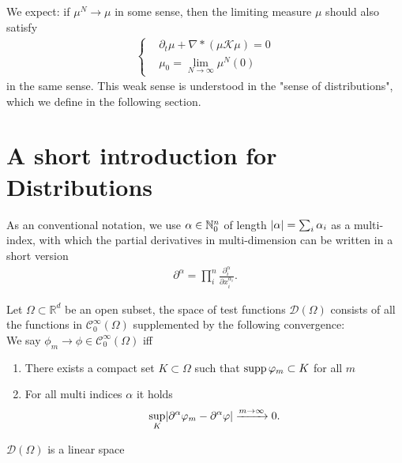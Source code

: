 We expect: if $\mu ^{N} \to \mu  $  in some sense, then the limiting measure $\mu $ should also satisfy 
 \begin{align*}
  \begin{cases}
    &\partial_t \mu  + \nabla * (\mu \mathcal{K} \mu ) = 0 \\
    & \mu_0=\lim_{N\to\infty}\mu^N(0)
  \end{cases}
\end{align*}
in the same sense. This weak sense is understood in the "sense of distributions", which we define in the following section.

\section{A short introduction for Distributions}

As an conventional notation, we use $\alpha \in \mathbb{N}_0^n$ of length $\lvert\alpha \rvert = \sum_{i} \alpha_i$ as a multi-index, with which the partial derivatives in multi-dimension can be written in a short version
	\begin{align*}
	\partial^{\alpha } = \prod^n_i \frac{\partial^\alpha_i}{\partial x_i^{\alpha_i}}
	.\end{align*}

\begin{definition}
 Let $\Omega  \subset  \mathbb{R}^{d} $  be an open subset, the space of test functions $\mathcal{D}(\Omega )$
 consists of all the functions in $\mathcal{C}_0^{\infty}(\Omega ) $ supplemented by the following convergence: \\[1ex]
 We say $\phi_m \to  \phi \in  \mathcal{C}_0^{\infty}(\Omega ) $ iff 
 \begin{enumerate}
   \item There exists a compact set $K \subset  \Omega $ such that $\operatorname*{supp} \varphi_m \subset  K$ for all $ m$
   \item For all multi indices $\alpha $ it holds 
     \begin{align*}
       \sup_K \lvert\partial ^{\alpha } \varphi_m - \partial ^{\alpha } \varphi   \rvert \xrightarrow{m\to \infty}  0 
     .\end{align*}
 \end{enumerate}
\end{definition}
\begin{remark}
 $\mathcal{D}(\Omega )$  is a linear space
\end{remark}

